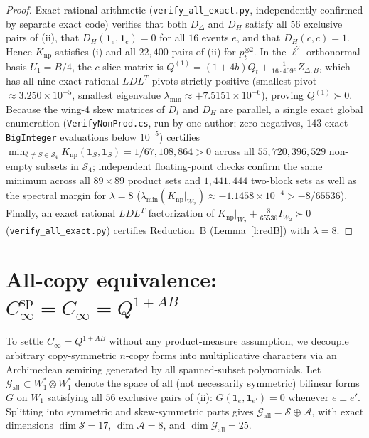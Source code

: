 \documentclass[11pt,a4paper]{article}
\theoremstyle{definition}
\theoremstyle{remark}
\newcommand{\ind}[1]{\mathbf{1}_{#1}}
\newcommand{\QAB}{Q^{1+AB}}
\newcommand{\Gall}{\mathcal{G}_{\mathrm{all}}}
\begin{document}
\begin{proof}
Exact rational arithmetic (\texttt{verify\_all\_exact.py}, independently confirmed by separate exact code) verifies that both $D_\Delta$ and $D_H$ satisfy all $56$ exclusive pairs of (ii), that $D_H(\ind e, \ind e) = 0$ for all $16$ events $e$, and that $D_H(c, c) = 1$. Hence $K_{\mathrm{np}}$ satisfies (i) and all $22{,}400$ pairs of (ii) for $p_t^{\otimes 2}$. In the $\ell^2$-orthonormal basis $U_1 = B/4$, the $c$-slice matrix is $Q^{(1)} = (1+4b) Q_t + \frac{1}{16 \cdot 4096} Z_{\Delta,B}$, which has all nine exact rational $LDL^T$ pivots strictly positive (smallest pivot $\approx 3.250 \times 10^{-5}$, smallest eigenvalue $\lambda_{\min} \approx +7.5151 \times 10^{-6}$), proving $Q^{(1)} \succ 0$. Because the wing-4 skew matrices of $D_t$ and $D_H$ are parallel, a single exact global enumeration (\texttt{VerifyNonProd.cs}, run by one author; zero negatives, $143$ exact \texttt{BigInteger} evaluations below $10^{-5}$) certifies $\min_{\emptyset \neq S \in \mathcal{S}_4} K_{\mathrm{np}}(\ind S, \ind S) = 1/67{,}108{,}864 > 0$ across all $55{,}720{,}396{,}529$ non-empty subsets in $\mathcal{S}_4$; independent floating-point checks confirm the same minimum across all $89 \times 89$ product sets and $1{,}441{,}444$ two-block sets as well as the spectral margin for $\lambda = 8$ ($\lambda_{\min}(K_{\mathrm{np}}|_{W_2}) \approx -1.1458 \times 10^{-4} > -8/65536$). Finally, an exact rational $LDL^T$ factorization of $K_{\mathrm{np}}|_{W_2} + \frac{8}{65536} I_{W_2} \succ 0$ (\texttt{verify\_all\_exact.py}) certifies Reduction~B (Lemma~\ref{l:redB}) with $\lambda = 8$.
\end{proof}

\section{All-copy equivalence: \texorpdfstring{$C_\infty^{\mathrm{sp}} = C_\infty = \QAB$}{C\_inf\^{}sp = C\_inf = Q\^{}(1+AB)}}\label{s:allcopy}

To settle $C_\infty = \QAB$ without any product-measure assumption, we decouple arbitrary copy-symmetric $n$-copy forms into multiplicative characters via an Archimedean semiring generated by all spanned-subset polynomials. Let $\Gall \subset W_1^* \otimes W_1^*$ denote the space of all (not necessarily symmetric) bilinear forms $G$ on $W_1$ satisfying all $56$ exclusive pairs of (ii): $G(\ind e, \ind{e'}) = 0$ whenever $e \perp e'$. Splitting into symmetric and skew-symmetric parts gives $\Gall = \mathcal{S} \oplus \mathcal{A}$, with exact dimensions $\dim \mathcal{S} = 17$, $\dim \mathcal{A} = 8$, and $\dim \Gall = 25$.
\end{document}
